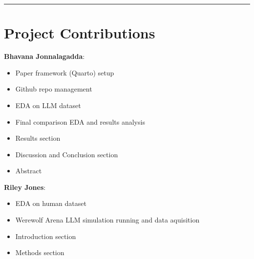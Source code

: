 \documentclass[
  letterpaper,
  DIV=11,
  numbers=noendperiod]{scrreprt}
\providecommand{\tightlist}{%
  \setlength{\itemsep}{0pt}\setlength{\parskip}{0pt}}
\begin{document}
\begin{center}\rule{0.5\linewidth}{0.5pt}\end{center}

\chapter{Project Contributions}\label{project-contributions}

\textbf{Bhavana Jonnalagadda}:

\begin{itemize}
\tightlist
\item
  Paper framework (Quarto) setup
\item
  Github repo management
\item
  EDA on LLM dataset
\item
  Final comparison EDA and results analysis
\item
  Results section
\item
  Discussion and Conclusion section
\item
  Abstract
\end{itemize}

\textbf{Riley Jones}:

\begin{itemize}
\tightlist
\item
  EDA on human dataset
\item
  Werewolf Arena LLM simulation running and data aquisition
\item
  Introduction section
\item
  Methods section
\end{itemize}
\end{document}
